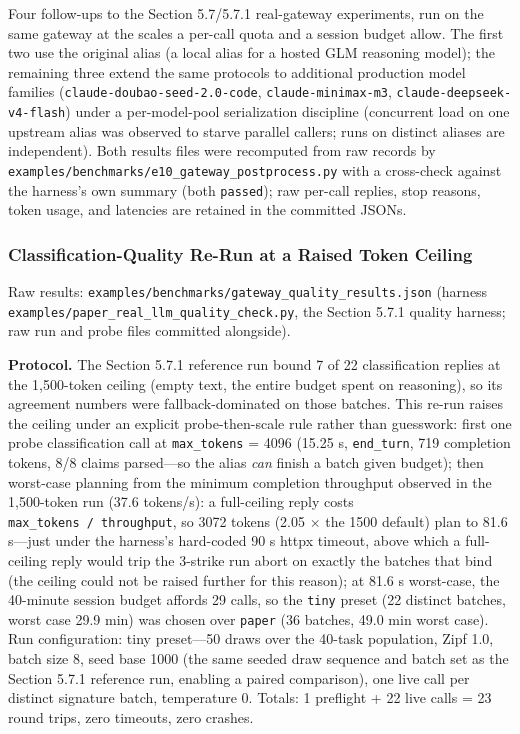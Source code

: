 \documentclass[
  11pt,
]{article}
\begin{document}
Four follow-ups to the Section 5.7/5.7.1 real-gateway experiments, run
on the same gateway at the scales a per-call quota and a session budget
allow. The first two use the original alias (a local alias for a hosted
GLM reasoning model); the remaining three extend the same protocols to
additional production model families
(\texttt{claude-doubao-seed-2.0-code}, \texttt{claude-minimax-m3},
\texttt{claude-deepseek-v4-flash}) under a per-model-pool serialization
discipline (concurrent load on one upstream alias was observed to starve
parallel callers; runs on distinct aliases are independent). Both
results files were recomputed from raw records by
\texttt{examples/benchmarks/e10\_gateway\_postprocess.py} with a
cross-check against the harness's own summary (both \texttt{passed});
raw per-call replies, stop reasons, token usage, and latencies are
retained in the committed JSONs.

\subsubsection{Classification-Quality Re-Run at a Raised Token
Ceiling}\label{classification-quality-re-run-at-a-raised-token-ceiling}

Raw results: \texttt{examples/benchmarks/gateway\_quality\_results.json}
(harness \texttt{examples/paper\_real\_llm\_quality\_check.py}, the
Section 5.7.1 quality harness; raw run and probe files committed
alongside).

\textbf{Protocol.} The Section 5.7.1 reference run bound 7 of 22
classification replies at the 1,500-token ceiling (empty text, the
entire budget spent on reasoning), so its agreement numbers were
fallback-dominated on those batches. This re-run raises the ceiling
under an explicit probe-then-scale rule rather than guesswork: first one
probe classification call at \texttt{max\_tokens} = 4096 (15.25 s,
\texttt{end\_turn}, 719 completion tokens, 8/8 claims parsed---so the
alias \emph{can} finish a batch given budget); then worst-case planning
from the minimum completion throughput observed in the 1,500-token run
(37.6 tokens/s): a full-ceiling reply costs
\texttt{max\_tokens\ /\ throughput}, so 3072 tokens (2.05 \(\times\) the
1500 default) plan to 81.6 s---just under the harness's hard-coded 90 s
httpx timeout, above which a full-ceiling reply would trip the 3-strike
run abort on exactly the batches that bind (the ceiling could not be
raised further for this reason); at 81.6 s worst-case, the 40-minute
session budget affords 29 calls, so the \texttt{tiny} preset (22
distinct batches, worst case 29.9 min) was chosen over \texttt{paper}
(36 batches, 49.0 min worst case). Run configuration: tiny preset---50
draws over the 40-task population, Zipf 1.0, batch size 8, seed base
1000 (the same seeded draw sequence and batch set as the Section 5.7.1
reference run, enabling a paired comparison), one live call per distinct
signature batch, temperature 0. Totals: 1 preflight + 22 live calls = 23
round trips, zero timeouts, zero crashes.
\end{document}
